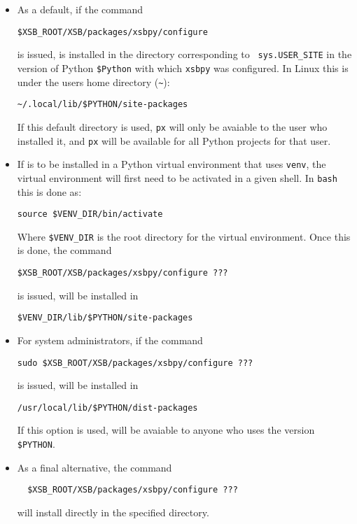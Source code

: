 \begin{itemize}
\item As a default, if the command

  {\tt \$XSB\_ROOT/XSB/packages/xsbpy/configure}

  is issued, \px{} is installed in the directory corresponding to {\tt
    sys.USER\_SITE} in the version of Python {\tt \$Python} with which
  {\tt xsbpy} was configured. In Linux this is under the users home
  directory (\verb|~|):
\begin{verbatim}
~/.local/lib/$PYTHON/site-packages
\end{verbatim}
If this default directory is used, {\tt px} will only be avaiable to
the user who installed it, and {\tt px} will be available for all
Python projects for that user.

\item If \px{} is to be installed in a Python virtual environment
  that uses {\tt venv}, the virtual environment will first need to be
  activated in a given shell.  In {\tt bash} this is done as:

\begin{verbatim}
source $VENV_DIR/bin/activate
\end{verbatim}

Where {\tt \$VENV\_DIR} is the root directory for the virtual
environment.  Once this is done, the command

\begin{verbatim}  
$XSB_ROOT/XSB/packages/xsbpy/configure ???
\end{verbatim}

is issued, \px{} will be installed in 

\begin{verbatim}
$VENV_DIR/lib/$PYTHON/site-packages
\end{verbatim}

\item For system administrators, if the command

\begin{verbatim}  
sudo $XSB_ROOT/XSB/packages/xsbpy/configure ???
\end{verbatim}

  is issued, \px{} will be installed in

\begin{verbatim}  
/usr/local/lib/$PYTHON/dist-packages
\end{verbatim}  

  If this option is used, \px{} will be avaiable to anyone who uses
  the version {\tt \$PYTHON}.

\item As a final alternative, the command 

\begin{verbatim}  
  $XSB_ROOT/XSB/packages/xsbpy/configure ???
\end{verbatim}

will install \px{} directly in the specified directory.
\end{itemize}

